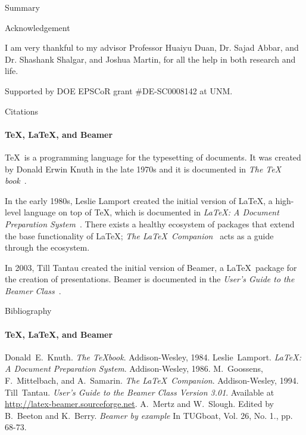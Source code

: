 \documentclass[9pt]{beamer}
\begin{document}
\begin{darkframes}
\begin{frame}{Summary}
\end{frame}



\begin{frame}{Acknowledgement}

I am very thankful to my advisor Professor Huaiyu Duan, Dr. Sajad Abbar, and Dr. Shashank Shalgar, and Joshua Martin, for all the help in both research and life.

Supported by DOE EPSCoR grant \#DE-SC0008142 at UNM.

\end{frame}






    \begin{frame}[label=citations]{Citations}
      \framesubtitle{\TeX, \LaTeX, and Beamer}

      \justifying\TeX\ is a programming language for the typesetting
      of documents. It was created by Donald Erwin Knuth in the late
      1970s and it is documented in \emph{The \TeX
      book}~\cite{knuth84}.

      In the early 1980s, Leslie Lamport created the initial version
      of \LaTeX, a high-level language on top of \TeX, which is
      documented in \emph{\LaTeX : A Document Preparation
      System}~\cite{lamport94}. There exists a healthy ecosystem of
      packages that extend the base functionality of \LaTeX;
      \emph{The \LaTeX\ Companion}~\cite{MG94} acts as a guide
      through the ecosystem.

      In 2003, Till Tantau created the initial version of Beamer, a
      \LaTeX\ package for the creation of presentations. Beamer is
      documented in the \emph{User's Guide to the Beamer
      Class}~\cite{tantau04}.
    \end{frame}

    \begin{frame}[label=bibliography]{Bibliography}
      \framesubtitle{\TeX, \LaTeX, and Beamer}
      \begin{thebibliography}{9}
            Donald~E.~Knuth.
            \emph{The \TeX book}.
            Addison-Wesley, 1984.
            Leslie~Lamport.
            \emph{\LaTeX : A Document Preparation System}.
            Addison-Wesley, 1986.
            M.~Goossens, F.~Mittelbach, and A.~Samarin.
            \emph{The \LaTeX\ Companion}.
            Addison-Wesley, 1994.
            Till~Tantau.
            \emph{User's Guide to the Beamer Class Version 3.01}.
            Available at \url{http://latex-beamer.sourceforge.net}.
            A.~Mertz and W.~Slough.
            Edited by B.~Beeton and K.~Berry.
            \emph{Beamer by example} In TUGboat,
              Vol. 26, No. 1., pp. 68-73.
      \end{thebibliography}
    \end{frame}

  \end{darkframes}
\end{document}
